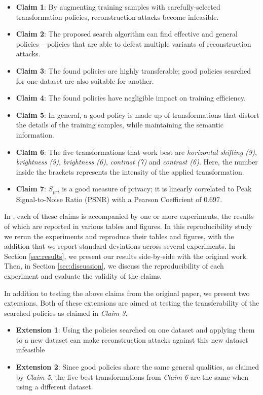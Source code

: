 \begin{itemize}[noitemsep]
\item \textbf{Claim 1}: By  augmenting training samples with carefully-selected transformation  policies,  reconstruction attacks become infeasible.
\item \textbf{Claim 2}: The proposed search algorithm can find effective and general policies -- policies that are able to defeat multiple variants of reconstruction attacks.
\item \textbf{Claim 3}: The found policies are highly transferable; good policies searched for one dataset are also suitable for another.
\item \textbf{Claim 4}: The found policies have negligible impact on training efficiency.
\item \textbf{Claim 5}: In general, a good policy is made up of transformations that distort the details of the training samples, while maintaining the semantic information.
\item \textbf{Claim 6}: The five transformations that work best are \emph{horizontal shifting (9)}, \emph{brightness (9)}, \emph{brightness (6)}, \emph{contrast (7)} and \emph{contrast (6)}. Here, the number inside the brackets represents the intensity of the applied transformation.
\item \textbf{Claim 7}: $S_{pri}$ is a good measure of privacy; it is linearly correlated to Peak Signal-to-Noise Ratio (PSNR) \cite{hore2010} with a Pearson Coefficient \cite{stigler1989} of $0.697$.
\end{itemize}

In \cite{gao2021privacy}, each of these claims is accompanied by one or more experiments, the results of which are reported in various tables and figures. In this reproducibility study we rerun the experiments and reproduce their tables and figures, with the addition that we report standard deviations across several experiments. In Section \ref{sec:results}, we present our results side-by-side with the original work. Then, in Section \ref{sec:discussion}, we discuss the reproducibility of each experiment and evaluate the validity of the claims.\bigskip

In addition to testing the above claims from the original paper, we present two extensions. Both of these extensions are aimed at testing the transferability of the searched policies as claimed in \emph{Claim 3}.

\begin{itemize}[noitemsep]
    \item \textbf{Extension 1}: Using the policies searched on one dataset and applying them to a new dataset can make reconstruction attacks against this new dataset infeasible
    \item \textbf{Extension 2}: Since good policies share the same general qualities, as claimed by \emph{Claim 5}, the five best transformations from \emph{Claim 6} are the same when using a different dataset.
\end{itemize}

